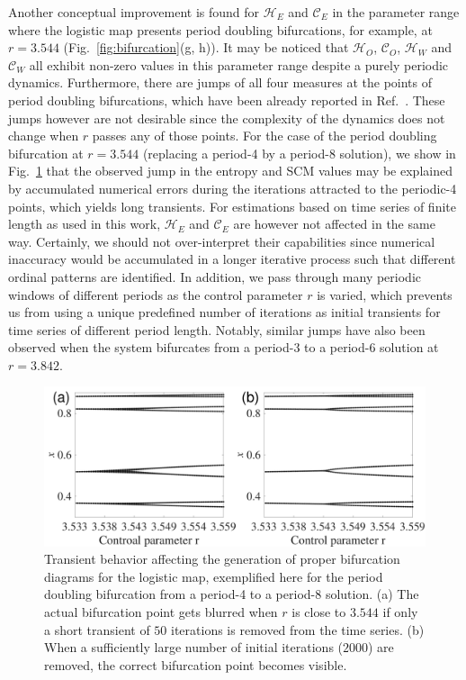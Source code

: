 \documentclass[12pt,aip,cha,reprint,nofootinbib]{revtex4-1}
\begin{document}
Another conceptual improvement is found for $\mathcal{H}_E$ and $\mathcal{C}_E$ in the parameter range where the logistic map presents period doubling bifurcations, for example, at $r = 3.544$ (Fig.~\ref{fig:bifurcation}(g, h)). It may be noticed that $\mathcal{H}_O$, $\mathcal{C}_O$, $\mathcal{H}_W$ and $\mathcal{C}_W$ all exhibit non-zero values in this parameter range despite a purely periodic dynamics. Furthermore, there are jumps of all four measures at the points of period doubling bifurcations, which have been already reported in Ref.~\cite{BandtPRL2002}. These jumps however are not desirable since the complexity of the dynamics does not change when $r$ passes any of those points. For the case of the period doubling bifurcation at $r=3.544$ (replacing a period-4 by a period-8 solution), we show in Fig.~\ref{fig:transient} that the observed jump in the entropy and SCM values may be explained by accumulated numerical errors during the iterations attracted to the periodic-4 points, which yields long transients. For estimations based on time series of finite length as used in this work, $\mathcal{H}_E$ and $\mathcal{C}_E$ are however not affected in the same way. Certainly, we should not over-interpret their capabilities since numerical inaccuracy would be accumulated in a longer iterative process such that different ordinal patterns are identified. In addition, we pass through many periodic windows of different periods as the control parameter $r$ is varied, which prevents us from using a unique predefined number of iterations as initial transients for time series of different period length. Notably, similar jumps have also been observed when the system bifurcates from a period-3 to a period-6 solution at $r = 3.842$. 

\begin{figure}
	\centering
	\includegraphics[width=\columnwidth]{period4_exampleTransients.pdf}
\caption{\small{Transient behavior affecting the generation of proper bifurcation diagrams for the logistic map, exemplified here for the period doubling bifurcation from a period-4 to a period-8 solution. (a) The actual bifurcation point gets blurred when $r$ is close to $3.544$ if only a short transient of $50$ iterations is removed from the time series. (b) When a sufficiently large number of initial iterations ($2000$) are removed, the correct bifurcation point becomes visible. }\label{fig:transient}}
\end{figure}
\end{document}
